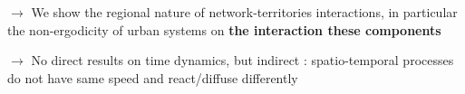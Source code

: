 \bigskip

$\rightarrow$ We show the regional nature of network-territories interactions, in particular the non-ergodicity of urban systems on \textbf{the interaction these components}

\bigskip

$\rightarrow$ No direct results on time dynamics, but indirect : spatio-temporal processes do not have same speed and react/diffuse differently

















